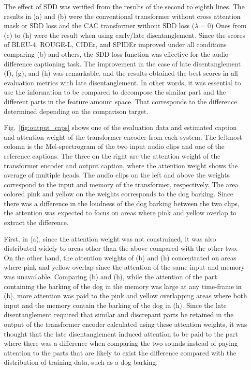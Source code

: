 The effect of SDD was verified from the results of the second to eighth lines.
The results in (a) and (b) were the conventional transformer without cross attention mask or SDD loss and the CAC transformer without SDD loss ($\lambda=0$)
Ones from (c) to (h) were the result when using early/late disentanglement.
Since the scores of BLEU-4, ROUGE-L, CIDEr, and SPIDEr improved under all conditions comparing (b) and others, the SDD loss function was effective for the audio difference captioning task.
The improvement in the case of late disentanglement (f), (g), and (h) was remarkable, and the results obtained the best scores in all evaluation metrics with late disentanglement.
In other words, it was essential to use the information to be compared to decompose the similar part and the different parts in the feature amount space. 
That corresponds to the difference determined depending on the comparison target.

Fig.~\ref{fig:output_caps} shows one of the evaluation data and estimated caption and attention weight of the transformer encoder from each system. 
The leftmost colomn is the Mel-spectrogram of the two input audio clips and one of the reference captions. 
The three on the right are the attention weight of the transformer encoder and output caption, where the attention weight shows the average of multiple heads. 
The audio clips on the left and above the weights correspond to the input and memory of the transformer, respectively. 
The area colored pink and yellow on the weights corresponds to the dog barking. 
Since there was a difference in the loudness of the dog barking between the two clips, the attention was expected to focus on areas where pink and yellow overlap to extract the difference. 

First, in (a), since the attention weight was not constrained, it was also distributed widely to areas other than the above compared with the other two. 
On the other hand, the attention weights of (b) and (h) concentrated on areas where pink and yellow overlap since the attention of the same input and memory was unavailable. 
Comparing (b) and (h), while the attention of the part containing the barking of the dog in the memory was large at any time-frame in (b), more attention was paid to the pink and yellow overlapping areas where both input and the memory contain the barking of the dog in (h). 
Since the late disentanglement required that similar and discrepant parts be retained in the output of the transformer encoder calculated using these attention weights, it was thought that the late disentanglement induced attention to be paid to the part where there was a difference when comparing the two sounds instead of paying attention to the parts that are likely to exist the difference compared with the distribution of training data, such as a dog barking. 

